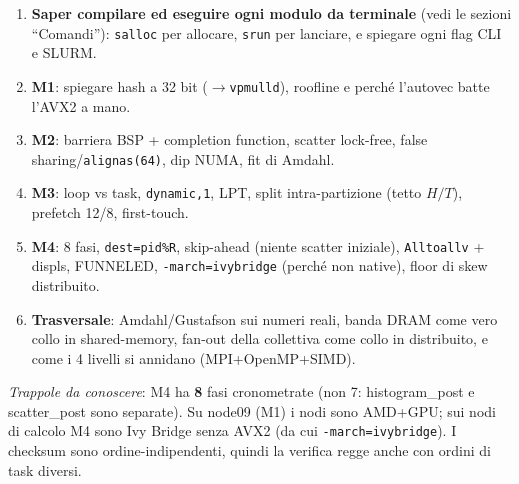 \documentclass[11pt,a4paper]{article}
\begin{document}
\begin{enumerate}
  \item \textbf{Saper compilare ed eseguire ogni modulo da terminale} (vedi le sezioni ``Comandi''): \texttt{salloc} per allocare, \texttt{srun} per lanciare, e spiegare ogni flag CLI e SLURM.
  \item \textbf{M1}: spiegare hash a 32 bit ($\to$\texttt{vpmulld}), roofline e perché l'autovec batte l'AVX2 a mano.
  \item \textbf{M2}: barriera BSP + completion function, scatter lock-free, false sharing/\texttt{alignas(64)}, dip NUMA, fit di Amdahl.
  \item \textbf{M3}: loop vs task, \texttt{dynamic,1}, LPT, split intra-partizione (tetto $H/T$), prefetch 12/8, first-touch.
  \item \textbf{M4}: 8 fasi, \texttt{dest=pid\%R}, skip-ahead (niente scatter iniziale), \texttt{Alltoallv} + displs, FUNNELED, \texttt{-march=ivybridge} (perché non native), floor di skew distribuito.
  \item \textbf{Trasversale}: Amdahl/Gustafson sui numeri reali, banda DRAM come vero collo in shared-memory, fan-out della collettiva come collo in distribuito, e come i 4 livelli si annidano (MPI+OpenMP+SIMD).
\end{enumerate}

\emph{Trappole da conoscere}: M4 ha \textbf{8} fasi cronometrate (non 7: histogram\_post e scatter\_post sono separate). Su node09 (M1) i nodi sono AMD+GPU; sui nodi di calcolo M4 sono Ivy Bridge senza AVX2 (da cui \texttt{-march=ivybridge}). I checksum sono ordine-indipendenti, quindi la verifica regge anche con ordini di task diversi.
\end{document}
